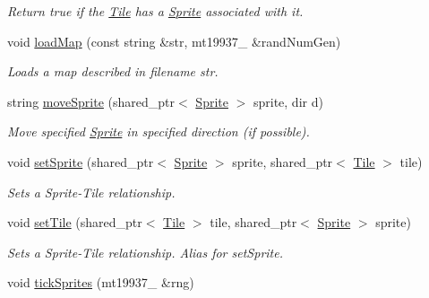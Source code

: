 \begin{DoxyCompactItemize}
\begin{DoxyCompactList}\small\item\em Return true if the \hyperlink{class_tile}{Tile} has a \hyperlink{class_sprite}{Sprite} associated with it. \end{DoxyCompactList}\item 
void \hyperlink{class_terr_a323ebb2299dabdcb42607ba96549c700}{load\+Map} (const string \&str, mt19937\+\_ \&rand\+Num\+Gen)\hypertarget{class_terr_a323ebb2299dabdcb42607ba96549c700}{}\label{class_terr_a323ebb2299dabdcb42607ba96549c700}

\begin{DoxyCompactList}\small\item\em Loads a map described in filename str. \end{DoxyCompactList}\item 
string \hyperlink{class_terr_aad9001c08a1ead4a0eba524482611cb9}{move\+Sprite} (shared\+\_\+ptr$<$ \hyperlink{class_sprite}{Sprite} $>$ sprite, dir d)\hypertarget{class_terr_aad9001c08a1ead4a0eba524482611cb9}{}\label{class_terr_aad9001c08a1ead4a0eba524482611cb9}

\begin{DoxyCompactList}\small\item\em Move specified \hyperlink{class_sprite}{Sprite} in specified direction (if possible). \end{DoxyCompactList}\item 
void \hyperlink{class_terr_aaa2f0f8ba60f462070a0f7d40d1f4ed0}{set\+Sprite} (shared\+\_\+ptr$<$ \hyperlink{class_sprite}{Sprite} $>$ sprite, shared\+\_\+ptr$<$ \hyperlink{class_tile}{Tile} $>$ tile)\hypertarget{class_terr_aaa2f0f8ba60f462070a0f7d40d1f4ed0}{}\label{class_terr_aaa2f0f8ba60f462070a0f7d40d1f4ed0}

\begin{DoxyCompactList}\small\item\em Sets a Sprite-\/\+Tile relationship. \end{DoxyCompactList}\item 
void \hyperlink{class_terr_abd9bbf7cc0d7f0ef48a2198f5b2047ba}{set\+Tile} (shared\+\_\+ptr$<$ \hyperlink{class_tile}{Tile} $>$ tile, shared\+\_\+ptr$<$ \hyperlink{class_sprite}{Sprite} $>$ sprite)\hypertarget{class_terr_abd9bbf7cc0d7f0ef48a2198f5b2047ba}{}\label{class_terr_abd9bbf7cc0d7f0ef48a2198f5b2047ba}

\begin{DoxyCompactList}\small\item\em Sets a Sprite-\/\+Tile relationship. Alias for set\+Sprite. \end{DoxyCompactList}\item 
void \hyperlink{class_terr_ab9563f05a13abff25ab62d814dab743f}{tick\+Sprites} (mt19937\+\_ \&rng)\hypertarget{class_terr_ab9563f05a13abff25ab62d814dab743f}{}\label{class_terr_ab9563f05a13abff25ab62d814dab743f}


\end{DoxyCompactItemize}
